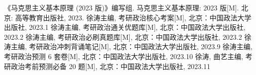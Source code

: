 \documentclass[utf-8, 10pt]{article}
\begin{document}

\begin{thebibliography}{1}
    《马克思主义基本原理 (2023 版)》编写组. 马克思主义基本原理: 2023 版[M].
    北京: 高等教育出版社, 2023.
    徐涛主编, 考研政治核心考案[M], 北京：中国政法大学出版社, 2023.1
    徐涛主编, 考研政治通关优题库[M], 北京：中国政法大学出版社, 2023.2
    徐涛主编, 考研政治必刷真题库[M], 北京：中国政法大学出版社, 2023.2
    徐涛主编, 考研政治冲刺背诵笔记[M], 北京：中国政法大学出版社, 2023.9
    徐涛主编, 考研政治预测 6 套卷[M], 北京：中国政法大学出版社, 2023.10
    徐涛, 曲艺主编, 考研政治考前预测必备 20 题[M], 北京：中国政法大学出版社, 2023.11
\end{thebibliography}
\end{document}

